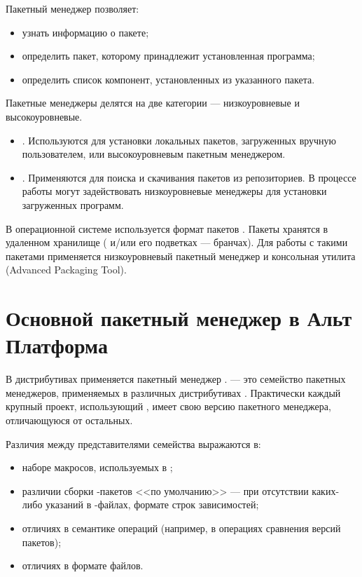 Пакетный менеджер позволяет:

\begin{itemize}
	\item узнать информацию о пакете;
	\item определить пакет, которому принадлежит установленная программа;
	\item определить список компонент, установленных из указанного пакета.
\end{itemize}

Пакетные менеджеры делятся на две категории --- низкоуровневые и высокоуровневые.

\begin{itemize}
	\item {}. Используются для установки 
		локальных пакетов, загруженных вручную пользователем, или высокоуровневым пакетным менеджером.
	\item {}. Применяются для поиска и скачивания пакетов из репозиториев. 
		В процессе работы могут задействовать низкоуровневые менеджеры для установки загруженных программ.
\end{itemize}

В операционной системе  используется формат пакетов . 
Пакеты  хранятся в удаленном хранилище ( и/или его подветках --- бранчах). 
Для работы с такими пакетами применяется низкоуровневый пакетный менеджер  
и консольная утилита  (Advanced Packaging Tool). 

\section{Основной пакетный менеджер в Альт Платформа}
В дистрибутивах  применяется пакетный менеджер .  --- 
это семейство пакетных менеджеров, применяемых в различных дистрибутивах . 
Практически каждый крупный проект, использующий , имеет свою версию пакетного менеджера, 
отличающуюся от остальных.

Различия между представителями семейства  выражаются в:

\begin{itemize}
	\item наборе макросов, используемых в ;
	\item различии сборки -пакетов <<по умолчанию>> --- при отсутствии каких-либо 
		указаний в -файлах, формате строк зависимостей;
	\item отличиях в семантике операций (например, в операциях сравнения версий пакетов);
	\item отличиях в формате файлов.
\end{itemize}

